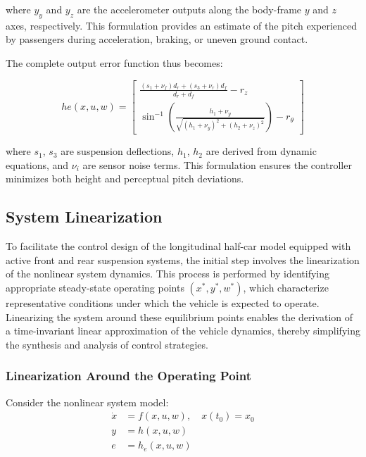 \documentclass[]{report}
\begin{document}
	where $y_y$ and $y_z$ are the accelerometer outputs along the body-frame $y$ and $z$ axes, respectively. This formulation provides an estimate of the pitch experienced by passengers during acceleration, braking, or uneven ground contact.
	
	
	The complete output error function thus becomes:
	
	\begin{equation}
		he(x, u, w) =
		\begin{bmatrix}
			\displaystyle \frac{(s_1 + \nu_f) d_r + (s_3 + \nu_r) d_f}{d_r + d_f} - r_z \\
			\displaystyle \sin^{-1}\left( \frac{h_1 + \nu_y}{\sqrt{(h_1 + \nu_y)^2 + (h_2 + \nu_z)^2}} \right) - r_\theta
		\end{bmatrix}
	\end{equation}
	
	where $s_1$, $s_3$ are suspension deflections, $h_1$, $h_2$ are derived from dynamic equations, and $\nu_i$ are sensor noise terms. This formulation ensures the controller minimizes both height and perceptual pitch deviations. 
	
	\subsection{System Linearization}
	
	To facilitate the control design of the longitudinal half-car model equipped with active front and rear suspension systems, the initial step involves the linearization of the nonlinear system dynamics. This process is performed by identifying appropriate steady-state operating points \((x^*, y^*, w^*)\), which characterize representative conditions under which the vehicle is expected to operate. Linearizing the system around these equilibrium points enables the derivation of a time-invariant linear approximation of the vehicle dynamics, thereby simplifying the synthesis and analysis of control strategies.
	
	\subsubsection{Linearization Around the Operating Point}
	
	Consider the nonlinear system model:
	\begin{equation}
		\label{eq:nonlinear_model}
		\begin{aligned}
			\dot{x} &= f(x, u, w), \quad x(t_0) = x_0 \\
			y &= h(x, u, w) \\
			e &= h_e(x, u, w)
		\end{aligned}
	\end{equation}
	
\end{document}
